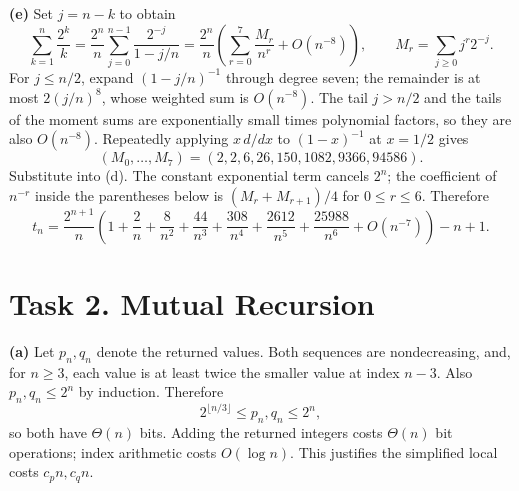 \documentclass[11pt]{article}
\begin{document}
\textbf{(e)} Set $j=n-k$ to obtain
\[
\sum_{k=1}^n\frac{2^k}{k}
=\frac{2^n}{n}\sum_{j=0}^{n-1}\frac{2^{-j}}{1-j/n}
=\frac{2^n}{n}\left(\sum_{r=0}^7\frac{M_r}{n^r}+O(n^{-8})\right),
\qquad M_r=\sum_{j\geq0}j^r2^{-j}.
\]
For $j\leq n/2$, expand $(1-j/n)^{-1}$ through degree seven;
the remainder is at most $2(j/n)^8$, whose weighted sum is $O(n^{-8})$.
The tail $j>n/2$ and the tails of the moment sums are exponentially small
times polynomial factors, so they are also $O(n^{-8})$.
Repeatedly applying $x\,d/dx$ to $(1-x)^{-1}$ at $x=1/2$ gives
\[
(M_0,\ldots,M_7)=(2,2,6,26,150,1082,9366,94586).
\]
Substitute into (d). The constant exponential term cancels $2^n$;
the coefficient of $n^{-r}$ inside the parentheses below is
$(M_r+M_{r+1})/4$ for $0\leq r\leq6$. Therefore
\[
\boxed{t_n=\frac{2^{n+1}}n\left(1+\frac2n+\frac8{n^2}
 +\frac{44}{n^3}+\frac{308}{n^4}+\frac{2612}{n^5}
 +\frac{25988}{n^6}+O(n^{-7})\right)-n+1.}
\]

\newpage
\section*{Task 2. Mutual Recursion}

\textbf{(a)} Let $p_n,q_n$ denote the returned values. Both sequences are
nondecreasing, and, for $n\geq3$, each value is at least twice the smaller
value at index $n-3$. Also $p_n,q_n\leq2^n$ by induction. Therefore
\[
2^{\lfloor n/3\rfloor}\leq p_n,q_n\leq2^n,
\]
so both have $\Theta(n)$ bits. Adding the returned integers costs
$\Theta(n)$ bit operations; index arithmetic costs $O(\log n)$.
This justifies the simplified local costs $c_pn,c_qn$.
\end{document}
